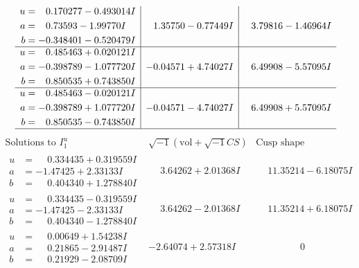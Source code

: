 \documentclass[1p]{elsarticle_modified}
\theoremstyle{definition}
\newcommand{\I}{\sqrt{-1}}
\begin{document}
$$\begin{array}{c|c|c}
\begin{aligned}
u &= \phantom{-}0.170277 - 0.493014 I \\
a &= \phantom{-}0.73593 - 1.99770 I \\
b &= -0.348401 - 0.520479 I\end{aligned}
 & \phantom{-}1.35750 - 0.77449 I & \phantom{-}3.79816 - 1.46964 I \\ \hline\begin{aligned}
u &= \phantom{-}0.485463 + 0.020121 I \\
a &= -0.398789 - 1.077720 I \\
b &= \phantom{-}0.850535 + 0.743850 I\end{aligned}
 & -0.04571 + 4.74027 I & \phantom{-}6.49908 - 5.57095 I \\ \hline\begin{aligned}
u &= \phantom{-}0.485463 - 0.020121 I \\
a &= -0.398789 + 1.077720 I \\
b &= \phantom{-}0.850535 - 0.743850 I\end{aligned}
 & -0.04571 - 4.74027 I & \phantom{-}6.49908 + 5.57095 I\\
 \hline 
 \end{array}$$\newpage$$\begin{array}{c|c|c}  
\text{Solutions to }I^u_{1}& \I (\text{vol} + \sqrt{-1}CS) & \text{Cusp shape}\\
 \hline 
\begin{aligned}
u &= \phantom{-}0.334435 + 0.319559 I \\
a &= -1.47425 + 2.33133 I \\
b &= \phantom{-}0.404340 + 1.278840 I\end{aligned}
 & \phantom{-}3.64262 + 2.01368 I & \phantom{-}11.35214 - 6.18075 I \\ \hline\begin{aligned}
u &= \phantom{-}0.334435 - 0.319559 I \\
a &= -1.47425 - 2.33133 I \\
b &= \phantom{-}0.404340 - 1.278840 I\end{aligned}
 & \phantom{-}3.64262 - 2.01368 I & \phantom{-}11.35214 + 6.18075 I \\ \hline\begin{aligned}
u &= \phantom{-}0.00649 + 1.54238 I \\
a &= \phantom{-}0.21865 - 2.91487 I \\
b &= \phantom{-}0.21929 - 2.08709 I\end{aligned}
 & -2.64074 + 2.57318 I & \phantom{-0.000000 } 0 \\ \hline\begin{aligned}

\end{aligned}
\end{array}$$
\end{document}
